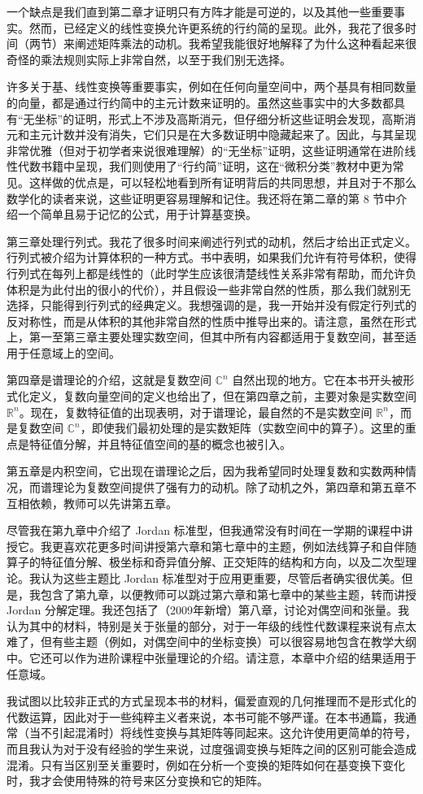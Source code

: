 \begin{preface}
一个缺点是我们直到第二章才证明只有方阵才能是可逆的，以及其他一些重要事实。然而，已经定义的线性变换允许更系统的行约简的呈现。此外，我花了很多时间（两节）来阐述矩阵乘法的动机。我希望我能很好地解释了为什么这种看起来很奇怪的乘法规则实际上非常自然，以至于我们别无选择。

许多关于基、线性变换等重要事实，例如在任何向量空间中，两个基具有相同数量的向量，都是通过行约简中的主元计数来证明的。虽然这些事实中的大多数都具有“无坐标”的证明，形式上不涉及高斯消元，但仔细分析这些证明会发现，高斯消元和主元计数并没有消失，它们只是在大多数证明中隐藏起来了。因此，与其呈现非常优雅（但对于初学者来说很难理解）的“无坐标”证明，这些证明通常在进阶线性代数书籍中呈现，我们则使用了“行约简”证明，这在“微积分类”教材中更为常见。这样做的优点是，可以轻松地看到所有证明背后的共同思想，并且对于不那么数学化的读者来说，这些证明更容易理解和记住。我还将在第二章的第 8 节中介绍一个简单且易于记忆的公式，用于计算基变换。

第三章处理行列式。我花了很多时间来阐述行列式的动机，然后才给出正式定义。行列式被介绍为计算体积的一种方式。书中表明，如果我们允许有符号体积，使得行列式在每列上都是线性的（此时学生应该很清楚线性关系非常有帮助，而允许负体积是为此付出的很小的代价），并且假设一些非常自然的性质，那么我们就别无选择，只能得到行列式的经典定义。我想强调的是，我一开始并没有假定行列式的反对称性，而是从体积的其他非常自然的性质中推导出来的。请注意，虽然在形式上，第一至第三章主要处理实数空间，但其中所有内容都适用于复数空间，甚至适用于任意域上的空间。

第四章是谱理论的介绍，这就是复数空间 $\mathbb{C}^n$ 自然出现的地方。它在本书开头被形式化定义，复数向量空间的定义也给出了，但在第四章之前，主要对象是实数空间 $\mathbb{R}^n$。现在，复数特征值的出现表明，对于谱理论，最自然的不是实数空间 $\mathbb{R}^n$，而是复数空间 $\mathbb{C}^n$，即使我们最初处理的是实数矩阵（实数空间中的算子）。这里的重点是特征值分解，并且特征值空间的基的概念也被引入。

第五章是内积空间，它出现在谱理论之后，因为我希望同时处理复数和实数两种情况，而谱理论为复数空间提供了强有力的动机。除了动机之外，第四章和第五章不互相依赖，教师可以先讲第五章。

尽管我在第九章中介绍了 Jordan 标准型，但我通常没有时间在一学期的课程中讲授它。我更喜欢花更多时间讲授第六章和第七章中的主题，例如法线算子和自伴随算子的特征值分解、极坐标和奇异值分解、正交矩阵的结构和方向，以及二次型理论。我认为这些主题比 Jordan 标准型对于应用更重要，尽管后者确实很优美。但是，我包含了第九章，以便教师可以跳过第六章和第七章中的某些主题，转而讲授 Jordan 分解定理。我还包括了（2009年新增）第八章，讨论对偶空间和张量。我认为其中的材料，特别是关于张量的部分，对于一年级的线性代数课程来说有点太难了，但有些主题（例如，对偶空间中的坐标变换）可以很容易地包含在教学大纲中。它还可以作为进阶课程中张量理论的介绍。请注意，本章中介绍的结果适用于任意域。

我试图以比较非正式的方式呈现本书的材料，偏爱直观的几何推理而不是形式化的代数运算，因此对于一些纯粹主义者来说，本书可能不够严谨。在本书通篇，我通常（当不引起混淆时）将线性变换与其矩阵等同起来。这允许使用更简单的符号，而且我认为对于没有经验的学生来说，过度强调变换与矩阵之间的区别可能会造成混淆。只有当区别至关重要时，例如在分析一个变换的矩阵如何在基变换下变化时，我才会使用特殊的符号来区分变换和它的矩阵。


\end{preface}

